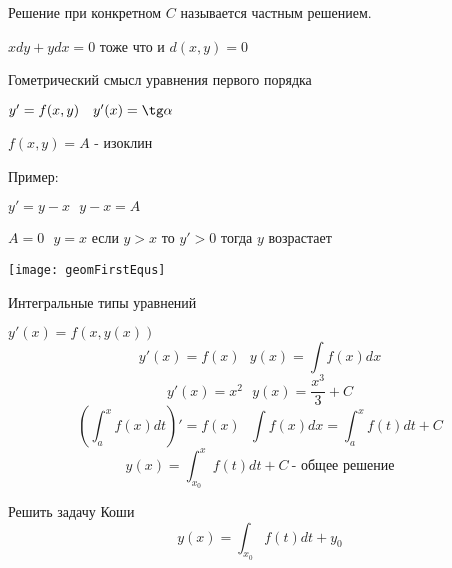   Решение при конкретном $C$ называется частным решением.

$xdy + ydx = 0$ тоже что и $d(x,y) = 0$

\begin{title}[\Large]
  Гометрический смысл уравнения первого порядка
\end{title}

$y' = f(x,y) ~~~ y'(x) = \tg \alpha$

$f(x, y) = A$ - изоклин

Пример:

$y' = y - x ~~~ y - x = A $

$A = 0 ~~~ y = x$ если $y > x$ то $y' > 0$ тогда $y$ возрастает

\texttt{[image: geomFirstEqus]}

\begin{title}
  Интегральные типы уравнений
\end{title}

$y'(x) = f(x, y(x))$
$$
y'(x) = f(x) ~~~ y(x) = \int f(x)dx
$$
$$
y'(x) = x^2 ~~~ y(x) =\frac{x^3}{3} + C
$$
$$
\left( \int_a^x f(x) dt \right)' = f(x) ~~~ \int f(x)dx = \int_a^x f(t)dt + C
$$
$$
y(x) = \int_{x_0}^x f(t)dt + C ~ \text{- общее решение}
$$

Решить задачу Коши
$$
y(x) = \int_{x_0}f(t)dt + y_0
$$